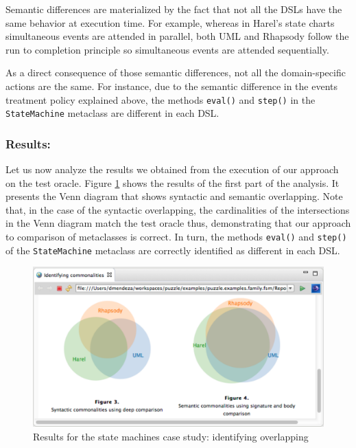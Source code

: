Semantic differences are materialized by the fact that not all the DSLs have the same behavior at execution time. For example, whereas in Harel's state charts simultaneous events are attended in parallel, both UML and Rhapsody follow the run to completion principle so simultaneous events are attended sequentially. 

As a direct consequence of those semantic differences, not all the domain-specific actions are the same. For instance, due to the semantic difference in the events treatment policy explained above, the methods \texttt{eval()} and \texttt{step()} in the \texttt{StateMachine} metaclass are different in each DSL. 

\vspace{-3mm}
\subsubsection{Results:} Let us now analyze the results we obtained from the execution of our approach on the test oracle. Figure \ref{fig:puzzle-overlapping} shows the results of the first part of the analysis. It presents the Venn diagram that shows syntactic and semantic overlapping. Note that, in the case of the syntactic overlapping, the cardinalities of the intersections in the Venn diagram match the test oracle thus, demonstrating that our approach to comparison of metaclasses is correct. In turn, the methods \texttt{eval()} and \texttt{step()} of the \texttt{StateMachine} metaclass are correctly identified as different in each DSL.

\begin{figure}
\centering
\includegraphics[width=1\linewidth]{images/puzzle-overlapping.pdf}
\caption{Results for the state machines case study: identifying overlapping}
\label{fig:puzzle-overlapping}
\end{figure}

